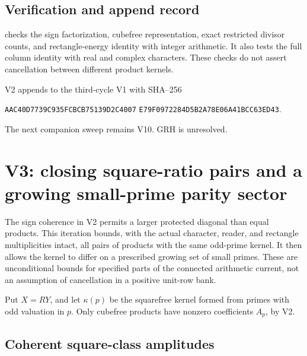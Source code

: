 \documentclass[11pt]{article}
\theoremstyle{remark}
\begin{document}
\subsection*{Verification and append record}

 checks the sign
factorization, cubefree representation, exact restricted divisor
counts, and rectangle-energy identity with integer arithmetic.
It also tests the full column identity with real and complex
characters.  These checks do not assert cancellation between
different product kernels.

V2 appends to the third-cycle V1 with SHA--256
\begin{center}
\texttt{AAC40D7739C935FCBCB75139D2C4007}\allowbreak
\texttt{E79F0972284D5B2A78E06A41BCC63ED43}.
\end{center}
The next companion sweep remains V10.  GRH is unresolved.
\endgroup

\clearpage
\section{V3: closing square-ratio pairs and a growing small-prime parity sector}
\label{sec:c3v3-square-classes}
\begingroup
\setcounter{equation}{0}
\renewcommand{\theequation}{C3.3.\arabic{equation}}
\renewcommand{\theHequation}{c3v3.\arabic{equation}}

The sign coherence in V2 permits a larger protected diagonal than
equal products.  This iteration bounds, with the actual character,
reader, and rectangle multiplicities intact, all pairs of products
with the same odd-prime kernel.  It then allows the kernel to differ
on a prescribed growing set of small primes.  These are unconditional
bounds for specified parts of the connected arithmetic current, not
an assumption of cancellation in a positive unit-row bank.

Put \(X=RY\), and let \(\kappa(p)\) be the squarefree kernel
formed from primes with odd valuation in \(p\).  Only cubefree
products have nonzero coefficients \(A_p\), by V2.

\subsection{Coherent square-class amplitudes}
\end{document}
